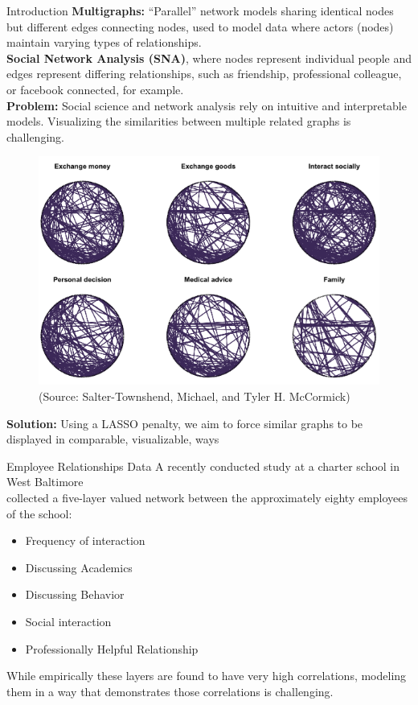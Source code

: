 \documentclass[final]{beamer}
\newlength{\onecolwid}
\begin{document}
\begin{frame}[t]
\begin{columns}[t]
\begin{column}{\onecolwid}
\begin{block}{Introduction}
  \textbf{Multigraphs:}
  ``Parallel'' network models sharing identical nodes but different
  edges connecting nodes, used to model data where
  actors (nodes) maintain varying types of relationships.\\
  \textbf{Social Network Analysis (SNA)}, where nodes represent
  individual people and edges represent differing relationships, such
  as friendship, professional colleague, or facebook connected, for
  example.\\
  \textbf{Problem:} Social science and network analysis rely
  on intuitive and interpretable models. Visualizing the similarities
  between multiple related graphs is challenging.
  \begin{figure}
    \centering
    \includegraphics{complexMultigraph.png}
    \caption{(Source: Salter-Townshend, Michael, and Tyler H. McCormick)}
  \end{figure}
  \textbf{Solution:} Using a LASSO penalty, we aim to force similar graphs
  to be displayed in comparable, visualizable, ways
\end{block}

\begin{block}{Employee Relationships Data}
  A recently conducted study at a charter school in West Baltimore\\
  collected a five-layer valued network between the
  approximately eighty employees of the school:
  \begin{itemize}
  \item Frequency of interaction
  \item Discussing Academics
  \item Discussing Behavior
  \item Social interaction
  \item Professionally Helpful Relationship
  \end{itemize}
While empirically these layers are found to have very high
correlations, modeling them in a way that demonstrates those
correlations is challenging.
\end{block}



\end{column}
\end{columns}
\end{frame}
\end{document}
